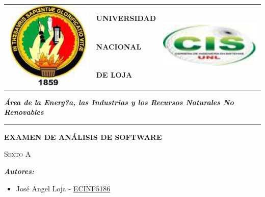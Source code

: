 \documentclass[a4paper,openright,12pt]{report}
\begin{document}



\pagestyle{fancy}
\renewcommand{\headrulewidth}{0pt}
\bigskip
\bigskip


{\setlength{\arrayrulewidth}{0.5mm}
\begin{tabular}{p{2 cm} | p{10
cm} p{3 cm}}
\multirow{3}{2cm}{\Large{\includegraphics[width=1.9 cm]{unloja}}} 
&\Large{\textbf{UNIVERSIDAD}}&\multirow{3}{2cm}{\Large{\includegraphics[width=3 cm]{logo13}}}\\

& \Large{\textbf{NACIONAL}}& \\
& \Large{\textbf{DE LOJA}}&\\
\end{tabular}
\bigskip
\bigskip

\begin{flushleft}


\raggedright{ 
\small{\textit{\textbf{Área de la Energ?a, las Industrias y los Recursos Naturales No Renovables}}}
}
\thinspace
\rule{1\textwidth}{0.04cm} 
\thinspace
{}
\end{flushleft}
\bigskip
\bigskip
\bigskip
\bigskip
\bigskip

\begin{center}
\begin{Huge}
\textbf {EXAMEN DE ANÁLISIS DE SOFTWARE}
\end{Huge}
\bigskip
\bigskip
\bigskip
\bigskip
\bigskip
\bigskip
\bigskip


\begin{LARGE}
\end{LARGE}
\small{\textsc{Sexto A}}\\
\bigskip
\end{center}
\bigskip
\bigskip


\begin{flushleft}
\textit{\textbf{Autores:}}
\begin{itemize}
\renewcommand{\labelitemi}{$\diamond$} 
\item José Angel Loja       -      \href{http://www.iralis.org/?q=node%2F10&paso=10&letra=L&id=5186/}{ECINF5186}
\end{itemize}
\bigskip
\bigskip
\end{flushleft}
\thinspace
\bigskip

}
\end{document}
